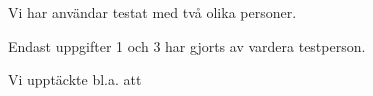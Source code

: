 Vi har användar testat med två olika personer.

Endast uppgifter 1 och 3 har gjorts av vardera testperson.

Vi upptäckte bl.a. att
